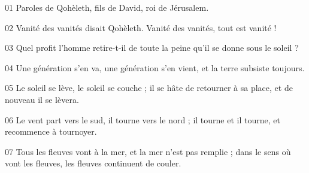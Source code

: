 01 Paroles de Qohèleth, fils de David, roi de Jérusalem.

02 Vanité des vanités disait Qohèleth. Vanité des vanités, tout est vanité !

03 Quel profit l’homme retire-t-il de toute la peine qu’il se donne sous le soleil ?

04 Une génération s’en va, une génération s’en vient, et la terre subsiste toujours.

05 Le soleil se lève, le soleil se couche ; il se hâte de retourner à sa place, et de nouveau il se lèvera.

06 Le vent part vers le sud, il tourne vers le nord ; il tourne et il tourne, et recommence à tournoyer.

07 Tous les fleuves vont à la mer, et la mer n’est pas remplie ; dans le sens où vont les fleuves, les fleuves continuent de couler.
